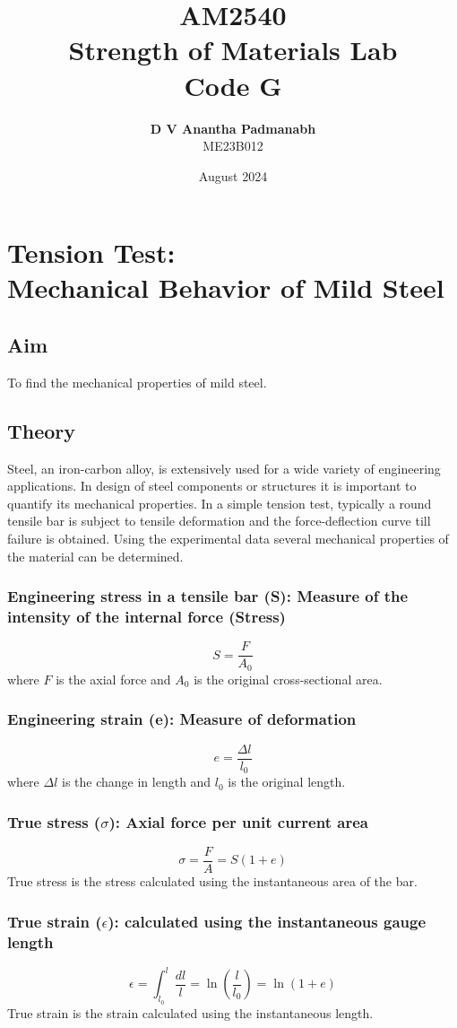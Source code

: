 \documentclass[12pt]{report}
\title{\Huge \textbf{AM2540}\\Strength of Materials Lab\\Code \textbf{G}}
\author{\textbf{D V Anantha Padmanabh}\\
ME23B012}
\date{August 2024}
\begin{document}
\maketitle

\chapter{Tension Test:\\Mechanical Behavior of Mild Steel}

\section{Aim}
To find the mechanical properties of mild steel.

\section{Theory}
Steel, an iron-carbon alloy, is extensively used for a wide variety of engineering
applications. In design of steel components or structures it is important to quantify its
mechanical properties. In a simple tension test, typically a round tensile bar is subject to
tensile deformation and the force-deflection curve till failure is obtained. Using the
experimental data several mechanical properties of the material can be determined.
\subsection*{Engineering stress in a tensile bar (S): Measure of the intensity of the internal force
    (Stress)}
\[
    S = \frac{F}{A_0}
\]
where \( F \) is the axial force and \( A_0 \) is the original cross-sectional area.


\subsection*{Engineering strain (e): Measure of deformation}
\[
    e = \frac{\Delta l}{l_0}
\]
where \( \Delta l \) is the change in length and \( l_0 \) is the original length.


\subsection*{True stress (\(\sigma \)): Axial force per unit current area}
\[
    \sigma = \frac{F}{A} = S(1+e)
\]
True stress is the stress calculated using the instantaneous area of the bar.

\subsection*{True strain (\(\epsilon\)): calculated using the instantaneous gauge length}
\[
    \epsilon = \int_{l_0}^{l} \frac{dl}{l} = \ln \left( \frac{l}{l_0} \right) = \ln(1+e)
\]
True strain is the strain calculated using the instantaneous length.
\end{document}
